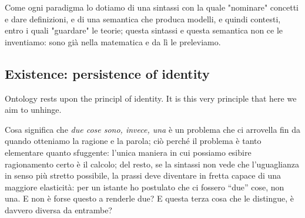 Come ogni paradigma lo dotiamo di una sintassi con la quale "nominare" concetti e dare definizioni, e di una semantica che produca modelli, e quindi contesti, entro i quali "guardare" le teorie; questa sintassi e questa semantica non ce le inventiamo: sono già nella matematica e da lì le preleviamo.
\subsection{Existence: persistence of identity}
Ontology rests upon the principl of identity. It is this very principle that here we aim to unhinge.

Cosa significa che \emph{due cose sono, invece, una} è un problema che ci arrovella fin da quando otteniamo la ragione e la parola; ciò perché il problema è tanto elementare quanto sfuggente: l'unica maniera in cui possiamo esibire ragionamento certo è il calcolo; del resto, se la sintassi non vede che l'uguaglianza in senso più stretto possibile, la prassi deve diventare in fretta capace di una maggiore elasticità: per un istante ho postulato che ci fossero ``due'' cose, non una. E non è forse questo a renderle due? E questa terza cosa che le distingue, è davvero diversa da entrambe?
